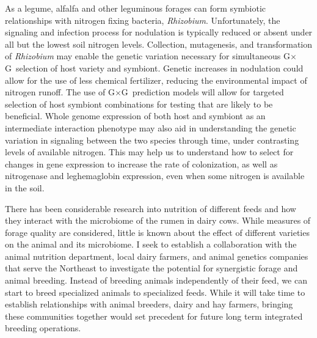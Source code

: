 \documentclass[10pt]{article}
\newcommand{\gxg}{G$\times$G}
\begin{document}
As a legume, alfalfa and other leguminous forages can form symbiotic relationships with nitrogen fixing bacteria, \emph{Rhizobium}. Unfortunately, the signaling and infection process for nodulation is typically reduced or absent under all but the lowest soil nitrogen levels. Collection, mutagenesis, and transformation of \emph{Rhizobium} may enable the genetic variation necessary for simultaneous \gxg\ selection of host variety and symbiont. Genetic increases in nodulation could allow for the use of less chemical fertilizer, reducing the environmental impact of nitrogen runoff. The use of \gxg\ prediction models will allow for targeted selection of host symbiont combinations for testing that are likely to be beneficial. Whole genome expression of both host and symbiont as an intermediate interaction phenotype may also aid in understanding the genetic variation in signaling between the two species through time, under contrasting levels of available nitrogen. This may help us to understand how to select for changes in gene expression to increase the rate of colonization, as well as nitrogenase and leghemaglobin expression, even when some nitrogen is available in the soil. 


There has been considerable research into nutrition of different feeds and how they interact with the microbiome of the rumen in dairy cows. While measures of forage quality are considered, little is known about the effect of different varieties on the animal and its microbiome. I seek to establish a collaboration with the animal nutrition department, local dairy farmers, and animal genetics companies that serve the Northeast to investigate the potential for synergistic forage and animal breeding. Instead of breeding animals independently of their feed, we can start to breed specialized animals to specialized feeds. While it will take time to establish relationships with animal breeders, dairy and hay farmers, bringing these communities together would set precedent for future long term integrated breeding operations.


\end{document}
